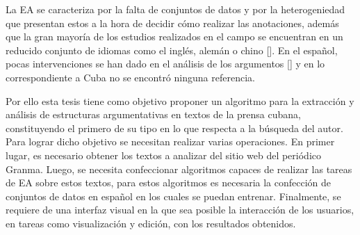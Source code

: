 

La EA se caracteriza por la falta de conjuntos de datos y 
por la heterogeniedad que presentan estos a la hora de decidir cómo realizar las 
anotaciones, además que la gran mayoría de los estudios realizados en el campo se encuentran en 
un reducido conjunto de idiomas como el inglés, alemán o chino [\cite{eger2018cross}]. 
En el español, pocas intervenciones se han dado en el análisis de los argumentos [\cite{esteve2020mineria}] y en 
lo correspondiente a Cuba no se encontró ninguna referencia. 


Por ello esta tesis tiene como objetivo proponer un algoritmo para 
la extracción y análisis de estructuras argumentativas en textos 
de la prensa cubana, constituyendo el primero de su tipo en lo que respecta a la búsqueda del autor. 
Para lograr dicho objetivo se necesitan realizar varias operaciones.
En primer lugar, es necesario obtener los textos a analizar del sitio 
web del periódico Granma. Luego, se necesita confeccionar algoritmos capaces de realizar las tareas 
de EA sobre estos textos, para estos algoritmos es necesaria la confección de conjuntos 
de datos en español en los cuales se puedan entrenar. Finalmente, se requiere de una interfaz visual 
en la que sea posible la interacción de los usuarios, en tareas como visualización y edición, 
con los resultados obtenidos. 

